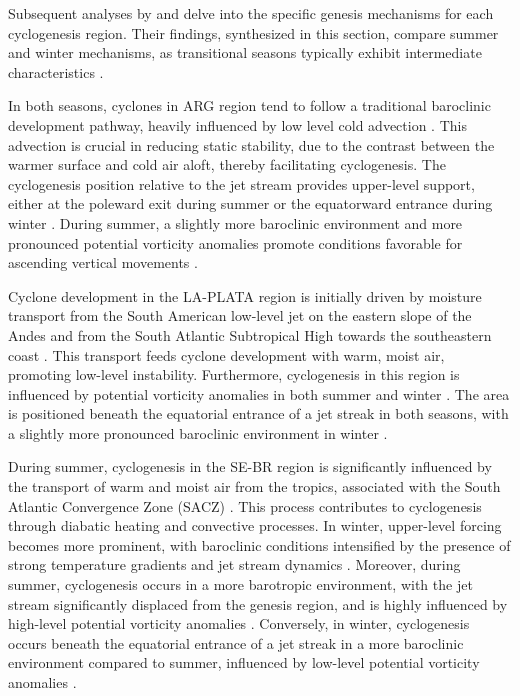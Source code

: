 Subsequent analyses by \citet{gramcianinov2019properties} and \citet{crespo2021potential} delve into the specific genesis mechanisms for each cyclogenesis region. Their findings, synthesized in this section, compare summer and winter mechanisms, as transitional seasons typically exhibit intermediate characteristics \citep{gan1991surface,hoskins2005new,gramcianinov2019properties,crespo2021potential}.

In both seasons, cyclones in ARG region tend to follow a traditional baroclinic development pathway, heavily influenced by low level cold advection \citep{gramcianinov2019properties}. This advection is crucial in reducing static stability, due to the contrast between the warmer surface and cold air aloft, thereby facilitating cyclogenesis. The cyclogenesis position relative to the jet stream provides upper-level support, either at the poleward exit during summer or the equatorward entrance during winter \citep{crespo2021potential}. During summer, a slightly more baroclinic environment and more pronounced potential vorticity anomalies promote conditions favorable for ascending vertical movements \citep{crespo2021potential}.

Cyclone development in the LA-PLATA region is initially driven by moisture transport from the South American low-level jet on the eastern slope of the Andes and from the South Atlantic Subtropical High towards the southeastern coast \citep{gramcianinov2019properties}. This transport feeds cyclone development with warm, moist air, promoting low-level instability. Furthermore, cyclogenesis in this region is influenced by potential vorticity anomalies in both summer and winter \citep{crespo2021potential}. The area is positioned beneath the equatorial entrance of a jet streak in both seasons, with a slightly more pronounced baroclinic environment in winter \citep{crespo2021potential}.

During summer, cyclogenesis in the SE-BR region is significantly influenced by the transport of warm and moist air from the tropics, associated with the South Atlantic Convergence Zone (SACZ) \citep{gramcianinov2019properties}. This process contributes to cyclogenesis through diabatic heating and convective processes. In winter, upper-level forcing becomes more prominent, with baroclinic conditions intensified by the presence of strong temperature gradients and jet stream dynamics \citep{gramcianinov2019properties}. Moreover, during summer, cyclogenesis occurs in a more barotropic environment, with the jet stream significantly displaced from the genesis region, and is highly influenced by high-level potential vorticity anomalies \citep{crespo2021potential}. Conversely, in winter, cyclogenesis occurs beneath the equatorial entrance of a jet streak in a more baroclinic environment compared to summer, influenced by low-level potential vorticity anomalies \citep{crespo2021potential}.

